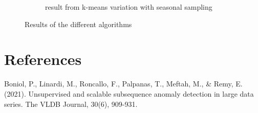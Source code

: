 \documentclass[11pt]{article}
\begin{document}
\begin{figure}[h]
\begin{subfigure}[b]{0.5\textwidth}
        \caption{result from k-means variation with seasonal sampling}
        \label{fig:algo3}
    \end{subfigure}
    \caption{Results of the different algorithms}
    \label{fig:results}
\end{figure}



\section{References}
\label{ref1} Boniol, P., Linardi, M., Roncallo, F., Palpanas, T., Meftah, M., \& Remy, E. (2021). Unsupervised and scalable subsequence anomaly detection in large data series. The VLDB Journal, 30(6), 909-931.
\end{document}
